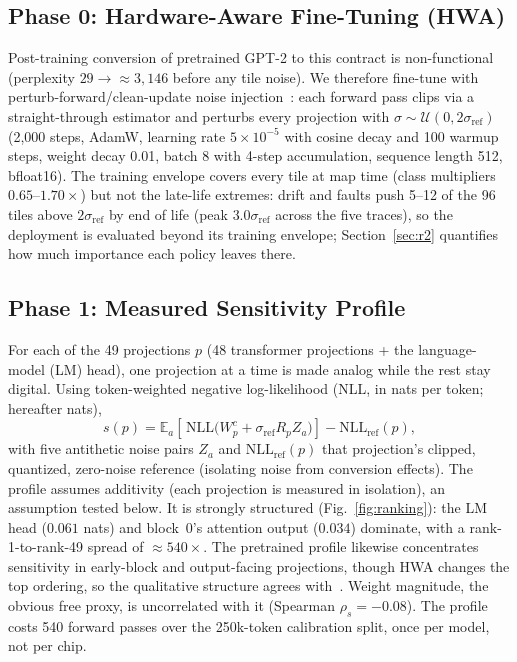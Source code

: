 \documentclass[journal]{IEEEtran}
\begin{document}
\subsection{Phase 0: Hardware-Aware Fine-Tuning (HWA)}
Post-training conversion of pretrained GPT-2 to this contract is
non-functional (perplexity $29 \rightarrow {\approx}3{,}146$ before any
tile noise). We therefore fine-tune with perturb-forward/clean-update
noise injection~\cite{joshi2020,rasch2023}: each forward pass clips via
a straight-through estimator and perturbs every projection
with $\sigma \sim \mathcal{U}(0, 2\sigma_{\mathrm{ref}})$ (2{,}000 steps,
AdamW, learning rate $5{\times}10^{-5}$ with cosine decay and 100
warmup steps, weight decay 0.01, batch 8 with 4-step accumulation,
sequence length 512, bfloat16). The training envelope
covers every tile at map time (class multipliers $0.65$--$1.70\times$)
but not the late-life extremes: drift and faults push 5--12 of the 96
tiles above $2\sigma_{\mathrm{ref}}$ by end of life (peak
$3.0\sigma_{\mathrm{ref}}$ across the five traces), so the deployment is
evaluated beyond its training envelope; Section~\ref{sec:r2}
quantifies how much importance each policy leaves there.

\subsection{Phase 1: Measured Sensitivity Profile}
For each of the 49 projections $p$ (48 transformer projections + the
language-model (LM) head), one projection at a time is made analog while
the rest stay digital. Using token-weighted negative log-likelihood (NLL,
in nats per token; hereafter nats),
\begin{equation}
s(p) = \mathbb{E}_a\!\left[\,\mathrm{NLL}\big(W^{c}_p + \sigma_{\mathrm{ref}}
R_p Z_a\big)\right] - \mathrm{NLL}_{\mathrm{ref}}(p),
\end{equation}
with five antithetic noise pairs $Z_a$ and
$\mathrm{NLL}_{\mathrm{ref}}(p)$ that projection's clipped, quantized,
zero-noise reference (isolating noise from conversion effects). The
profile assumes additivity (each projection is measured in
isolation), an assumption tested below. It is
strongly structured (Fig.~\ref{fig:ranking}): the LM head ($0.061$
nats) and block~0's attention output ($0.034$) dominate, with a
rank-1-to-rank-49 spread of ${\approx}540\times$. The pretrained
profile likewise concentrates sensitivity in early-block and
output-facing projections, though HWA changes the top ordering, so the
qualitative structure agrees with~\cite{lammie2026}. Weight
magnitude, the obvious free
proxy, is uncorrelated with it (Spearman $\rho_s{=}-0.08$). The profile
costs 540 forward passes over the 250k-token calibration split, once
per model, not per chip.
\end{document}
